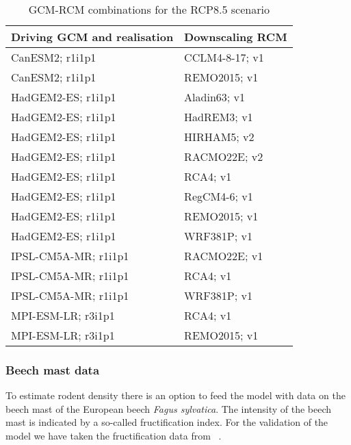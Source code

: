 \documentclass[a4paper, 11pt]{scrartcl}
\begin{document}
\begin{table}[h!]
\caption{GCM-RCM combinations for the RCP8.5 scenario}
\label{tab:climate_models}
\begin{tabularx}{\textwidth}{@{}ll@{}}
\toprule
\textbf{Driving GCM and realisation}  & \textbf{Downscaling RCM} 	\\
\midrule
CanESM2; r1i1p1 				 	  & CCLM4-8-17; v1  		 	\\
CanESM2; r1i1p1 				 	  & REMO2015; v1 				\\
HadGEM2-ES; r1i1p1 					  & Aladin63; v1 				\\
HadGEM2-ES; r1i1p1 					  & HadREM3; v1 				\\
HadGEM2-ES; r1i1p1 					  & HIRHAM5; v2 				\\
HadGEM2-ES; r1i1p1 					  & RACMO22E; v2 				\\
HadGEM2-ES; r1i1p1 					  & RCA4; v1 					\\
HadGEM2-ES; r1i1p1 					  & RegCM4-6; v1 				\\
HadGEM2-ES; r1i1p1 					  & REMO2015; v1 				\\
HadGEM2-ES; r1i1p1 					  & WRF381P; v1 				\\
IPSL-CM5A-MR; r1i1p1 				  & RACMO22E; v1 				\\
IPSL-CM5A-MR; r1i1p1 				  & RCA4; v1 					\\
IPSL-CM5A-MR; r1i1p1 				  & WRF381P; v1 				\\
MPI-ESM-LR; r3i1p1 					  & RCA4; v1 					\\
MPI-ESM-LR; r3i1p1 					  & REMO2015; v1 				\\
\bottomrule
\end{tabularx}
\end{table}


\subsubsection{Beech mast data}
To estimate rodent density there is an option to feed the model with data on the beech mast of the European beech \textit{Fagus sylvatica}.
The intensity of the beech mast is indicated by a so-called fructification index. For the validation of the model we have taken the
fructification data from ~\parencite{Brugger.2018}.
\end{document}
